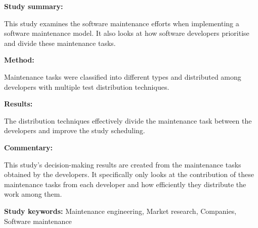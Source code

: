 \begin{tcolorbox}[colback=gray!5!white, colframe=pastelgreen!40!black, title=Trends in software maintenance tasks distribution among programmers: A study in a micro software company \cite{Stojanov2017}]
	\begin{minipage}[t]{0.25\textwidth}
		\textbf{Study summary:}
	\end{minipage}
	\hfill
	\begin{minipage}[t]{0.65\textwidth}
		This study examines the software maintenance efforts when implementing a software
maintenance model. It also looks at how software developers prioritise and divide these
maintenance tasks.
	\end{minipage}

	\vspace{0.75em} 

	\begin{minipage}[t]{0.25\textwidth}
		\textbf{Method:}
	\end{minipage}
	\hfill
	\begin{minipage}[t]{0.65\textwidth}
		Maintenance tasks were classified into different types and distributed among developers with multiple test distribution techniques.
	\end{minipage}

	\vspace{0.75em} 

	\begin{minipage}[t]{0.25\textwidth}
		\textbf{Results:}
	\end{minipage}
	\hfill
	\begin{minipage}[t]{0.65\textwidth}
		The distribution techniques effectively divide the maintenance task between the developers and improve the study scheduling.
	\end{minipage}

	\vspace{0.75em} 

	\begin{minipage}[t]{0.25\textwidth}
		\textbf{Commentary:}
	\end{minipage}
	\hfill
	\begin{minipage}[t]{0.65\textwidth}
		This study's decision-making results are created from the maintenance tasks obtained by the developers. It specifically only looks at the contribution of these maintenance tasks from
each developer and how efficiently they distribute the work among them.
	\end{minipage}
	\tcblower
	\textbf{Study keywords:} Maintenance engineering, Market research, Companies, Software
maintenance
\end{tcolorbox}

